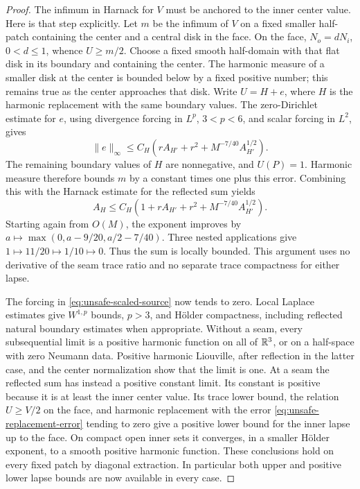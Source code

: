 \begin{proof}
The infimum in Harnack for \(V\) must be anchored to the inner
center value.  Here is that step explicitly.  Let \(m\) be the
infimum of \(V\) on a fixed smaller half-patch containing the
center and a central disk in the face.  On the face,
\(N_o=dN_i\), \(0<d\le1\), whence \(U\ge m/2\).
Choose a fixed smooth half-domain with that flat disk in its boundary
and containing the center.  The harmonic measure of a smaller disk
at the center is bounded below by a fixed positive number; this
remains true as the center approaches that disk.  Write \(U=H+e\),
where \(H\) is the harmonic replacement with the same boundary
values.  The zero-Dirichlet estimate for \(e\), using divergence
forcing in \(L^p\), \(3<p<6\), and scalar forcing in \(L^2\),
gives
\begin{equation}
 \|e\|_\infty\le
 C_H\left(rA_{H'}+r^2+M^{-7/40}A_{H'}^{1/2}\right).
 \label{eq:unsafe-replacement-error}
\end{equation}
The remaining boundary values of \(H\) are nonnegative, and
\(U(P)=1\).  Harmonic measure therefore bounds \(m\) by a
constant times one plus this error.  Combining this with the Harnack
estimate for the reflected sum yields
\begin{equation}
 A_H\le C_H\left(1+rA_{H'}+r^2+
                 M^{-7/40}A_{H'}^{1/2}\right).
 \label{eq:unsafe-seam-iteration}
\end{equation}
Starting again from \(O(M)\), the exponent improves by
\(a\mapsto\max(0,a-9/20,a/2-7/40)\).  Three nested applications
give \(1\mapsto11/20\mapsto1/10\mapsto0\).  Thus the sum is
locally bounded.  This argument uses no derivative of the seam trace
ratio and no separate trace compactness for either lapse.

The forcing in \eqref{eq:unsafe-scaled-source} now tends to zero.
Local Laplace estimates give \(W^{1,p}\) bounds, \(p>3\), and
H\"older compactness, including reflected natural boundary estimates
when appropriate.  Without a seam, every subsequential limit is a
positive harmonic function on all of \(\mathbb R^3\), or on a half-space
with zero Neumann data.  Positive harmonic Liouville, after reflection
in the latter case, and the center normalization show that the limit
is one.  At a seam the reflected sum has instead a positive constant
limit.  Its constant is positive because it is at least the inner
center value.  Its trace lower bound, the relation \(U\ge V/2\)
on the face, and harmonic replacement with the error
\eqref{eq:unsafe-replacement-error} tending to zero give a positive
lower bound for the inner lapse up to the face.  On compact open
inner sets it converges, in a smaller H\"older exponent, to a smooth
positive harmonic function.  These conclusions hold on every fixed
patch by diagonal extraction.  In particular both upper and positive
lower lapse bounds are now available in every case.


\end{proof}
